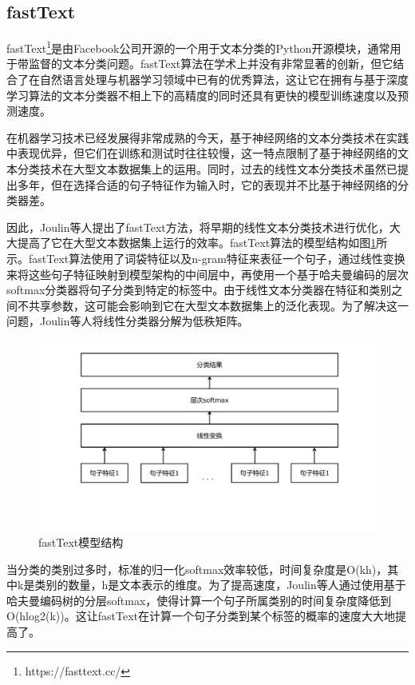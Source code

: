 \subsection{fastText}
fastText\footnote{https://fasttext.cc/}是由Facebook公司开源的一个用于文本分类的Python开源模块，通常用于带监督的文本分类问题。fastText算法在学术上并没有非常显著的创新，但它结合了在自然语言处理与机器学习领域中已有的优秀算法，这让它在拥有与基于深度学习算法的文本分类器不相上下的高精度的同时还具有更快的模型训练速度以及预测速度。

在机器学习技术已经发展得非常成熟的今天，基于神经网络的文本分类技术在实践中表现优异，但它们在训练和测试时往往较慢，这一特点限制了基于神经网络的文本分类技术在大型文本数据集上的运用。同时，过去的线性文本分类技术虽然已提出多年，但在选择合适的句子特征作为输入时，它的表现并不比基于神经网络的分类器差。

因此，Joulin等人提出了fastText方法\cite{DBLP:conf/eacl/GraveMJB17}，将早期的线性文本分类技术进行优化，大大提高了它在大型文本数据集上运行的效率。fastText算法的模型结构如图\ref{图2-1}所示。fastText算法使用了词袋特征以及n-gram特征来表征一个句子，通过线性变换来将这些句子特征映射到模型架构的中间层中，再使用一个基于哈夫曼编码的层次softmax分类器将句子分类到特定的标签中。由于线性文本分类器在特征和类别之间不共享参数，这可能会影响到它在大型文本数据集上的泛化表现。为了解决这一问题，Joulin等人将线性分类器分解为低秩矩阵。

\begin{figure}[htb]
    \centering
    \includegraphics[width=\textwidth]{image/fast-text.pdf}
    \caption{fastText模型结构\cite{DBLP:conf/eacl/GraveMJB17}} 
    \label{图2-1} 
\end{figure}

当分类的类别过多时，标准的归一化softmax效率较低，时间复杂度是O(kh)，其中k是类别的数量，h是文本表示的维度。为了提高速度，Joulin等人通过使用基于哈夫曼编码树的分层softmax，使得计算一个句子所属类别的时间复杂度降低到O(hlog2(k))。这让fastText在计算一个句子分类到某个标签的概率的速度大大地提高了。

